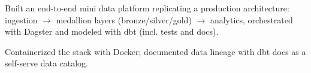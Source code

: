 
\vspace{3pt}
\begin{resume_list}
  \item Built an end-to-end mini data platform replicating a production architecture: ingestion $\rightarrow$ medallion layers (bronze/silver/gold) $\rightarrow$ analytics, orchestrated with Dagster and modeled with dbt (incl. tests and docs).
  \item Containerized the stack with Docker; documented data lineage with dbt docs as a self-serve data catalog.
\end{resume_list}
